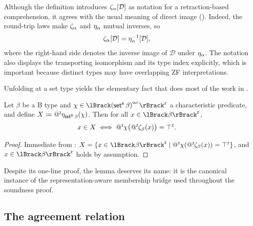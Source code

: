 \begin{remark}
  Although the definition introduces \(\cimg[\alpha]{\mathcal{D}}\) as notation for a retraction-based comprehension, it agrees with the usual meaning of direct image ().
  Indeed, the round-trip laws make \(\zeta_{\alpha}\) and \(\eta_{\alpha}\) mutual inverses, so
  \[
    \zeta_{\alpha}[\mathcal{D}] = \eta_{\alpha}^{-1}[\mathcal{D}],
  \]
  where the right-hand side denotes the inverse image of \(\mathcal{D}\) under \(\eta_{\alpha}\).
  The notation also displays the transporting isomorphism and its type index explicitly, which is important because distinct types may have overlapping ZF interpretations.
\end{remark}

Unfolding  at a set type yields the elementary fact that does most of the work in .

\begin{lemma}
  \label{lem:beer-bridge}
  Let \(\beta\) be a B type and \(\chi \in \interpZ{\toSMT{(\setB\beta)}}\) a characteristic predicate, and define
  \(X \coloneq \mathop{@^{\scriptscriptstyle{\mathsf{Z}}}}\mkern-4mu\eta_{\mathsf{set}^{\scriptscriptstyle{\mathsf{B}}}\,\beta}(\chi)\).
  Then for all \(x \in \interpZ{\beta}\),
  \[
    x \in X \iff \mathop{@^{\scriptscriptstyle{\mathsf{Z}}}}\mkern-4mu \chi\bigl(\mathop{@^{\scriptscriptstyle{\mathsf{Z}}}}\mkern-4mu\zeta_{\beta}(x)\bigr) = \top^{\scriptscriptstyle{\mathsf{Z}}}.
  \]
\end{lemma}

\begin{proof}
  Immediate from : \(X = \{ x \in \interpZ{\beta} \mid \appZ \chi(\appZ\canon{\beta}(x)) = \topZ \}\), and \(x \in \interpZ{\beta}\) holds by assumption.
\end{proof}

Despite its one-line proof, the lemma deserves its name: it is the canonical instance of the representation-aware membership bridge used throughout the soundness proof.

\subsection{The agreement relation}
\label{sec:beer-agreement}

